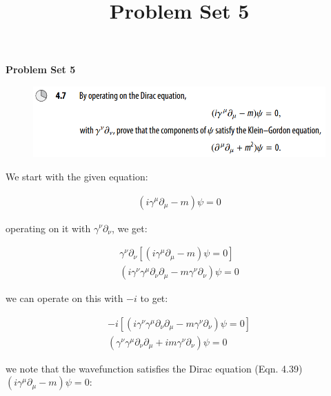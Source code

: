 \documentclass[11pt]{article}
\theoremstyle{definition}
\begin{document}
\setcounter{section}{2}
\title{Problem Set 5}

\pagestyle{fancy}
\fancyhf{}

\begin{center}
{\LARGE \bf Problem Set 5}\\
\end{center}

\begin{figure}[h!]
    \centering
    \includegraphics[scale = 0.5]{4.7.png}
\end{figure}

We start with the given equation:

\begin{align*}
    (i \gamma^{\mu} \partial_{\mu} - m)\psi = 0
\end{align*}

operating on it with $\gamma^{\nu} \partial_{\nu}$, we get:

\begin{align*}
    \gamma^{\nu} \partial_{\nu} \left[ (i \gamma^{\mu} \partial_{\mu} - m)\psi = 0 \right]\\
    (i \gamma^{\nu}\gamma^{\mu} \partial_{\nu}\partial_{\mu} - m\gamma^{\nu} \partial_{\nu})\psi = 0
\end{align*}

we can operate on this with $-i$ to get:

\begin{align*}
   -i \left[(i \gamma^{\nu}\gamma^{\mu} \partial_{\nu}\partial_{\mu} - m\gamma^{\nu} \partial_{\nu})\psi = 0\right]\\
    (\gamma^{\nu}\gamma^{\mu} \partial_{\nu}\partial_{\mu} +i m\gamma^{\nu} \partial_{\nu})\psi = 0
\end{align*}

we note that the wavefunction satisfies the Dirac equation (Eqn. 4.39) $(i \gamma^{\mu}\partial_{\mu} - m)\psi = 0$:
\end{document}
